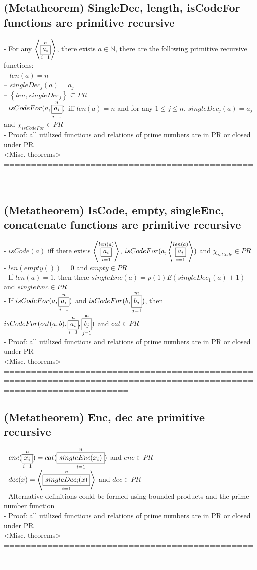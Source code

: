 \documentclass{book}
\newcommand{\set}[1]{\left\{ #1 \right\}}
\newcommand{\seq}[1]{\left\langle #1 \right\rangle}
\newcommand{\vdc}[3]{\underset{#2}{\overset{#3}{\fbox{$#1$}}}}
\begin{document}
\subsection{(Metatheorem) SingleDec, length, isCodeFor functions are primitive recursive} %
	- For any $\seq{\vdc{a_i}{i=1}{n}}$, there exists $a \in \mathbb{N}$, there are the following primitive recursive functions: \\
		-- $len(a) = n$ \\
		-- $singleDec_j(a) = a_j$ \\
		-- $\set{len, singleDec_j} \subseteq PR$ \\
	- $isCodeFor(a, \vdc{a_i}{i=1}{n})$ iff $len(a) = n$ and for any $1 \leq j \leq n$, $singleDec_j(a) = a_j$ and $\chi_{isCodeFor} \in PR$ \\
	- Proof: all utilized functions and relations of prime numbers are in PR or closed under PR \\ <Misc. theorems>
	===================================================================================================================
\subsection{(Metatheorem) IsCode, empty, singleEnc, concatenate functions are primitive recursive} %
	- $isCode(a)$ iff there exists $\seq{\vdc{a_i}{i=1}{len(a)}}$, $isCodeFor(a, \seq{\vdc{a_i}{i=1}{len(a)}})$ and $\chi_{isCode} \in PR$ \\
	- $len(empty()) = 0$ and $empty \in PR$ \\
	- If $len(a) = 1$, then there $singleEnc(a) = p(1) E (singleDec_1(a) + 1)$ and $singleEnc \in PR$ \\
	- If $isCodeFor(a, \vdc{a_i}{i=1}{n})$ and $isCodeFor(b, \vdc{b_j}{j=1}{m})$, then $isCodeFor(cat(a, b), \vdc{a_i}{i=1}{n}, \vdc{b_j}{j=1}{m})$ and $cat \in PR$ \\
	- Proof: all utilized functions and relations of prime numbers are in PR or closed under PR \\ <Misc. theorems>
	===================================================================================================================
\subsection{(Metatheorem) Enc, dec are primitive recursive} %
	- $enc(\vdc{x_i}{i=1}{n}) = cat(\vdc{singleEnc(x_i)}{i=1}{n})$ and $enc \in PR$ \\
	- $dec(x) = \seq{\vdc{singleDec_i(x)}{i=1}{n}}$ and $dec \in PR$ \\
	- Alternative definitions could be formed using bounded products and the prime number function \\
	- Proof: all utilized functions and relations of prime numbers are in PR or closed under PR \\ <Misc. theorems>
	===================================================================================================================
\end{document}
